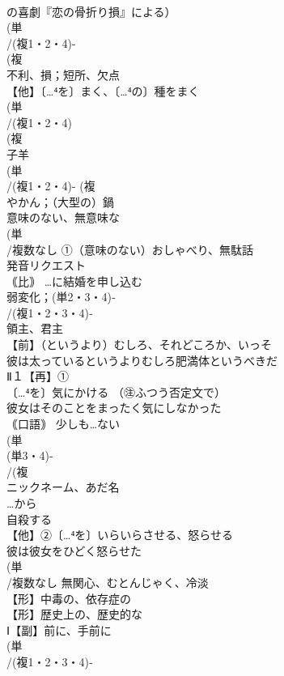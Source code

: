 \documentclass[8pt]{extreport}
\begin{document}
\begin{CJK}{UTF8}{min}
\\	の喜劇『恋の骨折り損』による）
\\	(単
\\	/(複1・2・4)-
\\	(複
\\	不利、損；短所、欠点 
\\	【他】〔…⁴を〕まく、〔…⁴の〕種をまく 
\\	(単
\\	/(複1・2・4)
\\	(複
\\	子羊 
\\	(単
\\	/(複1・2・4)- (複
\\	やかん；（大型の）鍋 
\\	意味のない、無意味な
\\	(単
\\	/複数なし ①（意味のない）おしゃべり、無駄話
\\	発音リクエスト	
\\	｟比｠ …に結婚を申し込む
\\	弱変化；(単2・3・4)‐
\\	/(複1・2・3・4)‐
\\	領主、君主
\\	【前】（というより）むしろ、それどころか、いっそ 
\\	彼は太っているというよりむしろ肥満体というべきだ
\\	Ⅱ１【再】①
\\	〔…⁴を〕気にかける （㊟ふつう否定文で） 
\\	彼女はそのことをまったく気にしなかった
\\	｟口語｠ 少しも…ない
\\	(単
\\	(単3・4)-
\\	/(複
\\	ニックネーム、あだ名 
\\	…から
\\	自殺する
\\	【他】②〔…⁴を〕いらいらさせる、怒らせる 
\\	彼は彼女をひどく怒らせた
\\	(単
\\	/複数なし 無関心、むとんじゃく、冷淡 
\\	【形】中毒の、依存症の 
\\	【形】歴史上の、歴史的な 
\\	Ⅰ【副】前に、手前に 
\\	(単
\\	/(複1・2・3・4)‐

\end{CJK}
\end{document}
